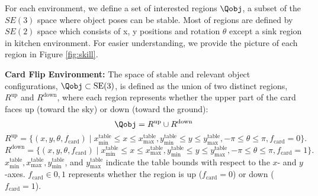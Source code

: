 For each environment, we define a set of interested regions $\Qobj$, a subset of the $SE(3)$ space where object poses can be stable. Most of regions are defined by $SE(2)$ space which consists of x, y positions and rotation $\theta$ except a sink region in kitchen environment. For easier understanding, we provide the picture of each region in Figure \ref{fig:skill}.



\textbf{Card Flip Environment:} \label{env:card_flip_region_descript}
The space of stable and relevant object configurations, $\Qobj \subset \text{SE(3)}$, is defined as the union of two distinct regions, $R^\text{up}$ and $R^\text{down}$, where each region represents whether the upper part of the card faces up (toward the sky) or down (toward the ground): 
\[
\Qobj = R^\text{up} \cup R^\text{down}
\]
\[
R^\text{up} = \{(x, y, \theta, f_{\text{card}}) \mid 
x^{\text{table}}_{\text{min}} \le x \le x^{\text{table}}_{\text{max}}, 
y^{\text{table}}_{\text{min}} \le y \le y^{\text{table}}_{\text{max}}, 
-\pi \le \theta \le \pi, f_{\text{card}}=0\}.
\]
\[
R^\text{down} = \{(x, y, \theta, f_{\text{card}}) \mid 
x^{\text{table}}_{\text{min}} \le x \le x^{\text{table}}_{\text{max}}, 
y^{\text{table}}_{\text{min}} \le y \le y^{\text{table}}_{\text{max}}, 
-\pi \le \theta \le \pi, f_{\text{card}}=1\}.
\]
$x^{\text{table}}_{\text{min}}, x^{\text{table}}_{\text{max}}, y^{\text{table}}_{\text{min}}$, and $y^{\text{table}}_{\text{max}}$ indicate the table bounds with respect to the $x$- and $y$-axes. $f_{\text{card}} \in {0, 1}$ represents whether the region is up ($f_{\text{card}} = 0$) or down ($f_{\text{card}} = 1$).


